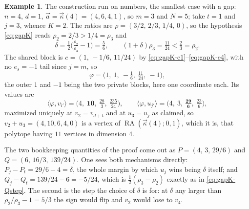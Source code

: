 \documentclass[11pt, a4paper, abstract=yes]{scrartcl}
\theoremstyle{definition}
\newtheorem{mexample}[definition]{Example}
\theoremstyle{remark}
\theoremstyle{plain}
\newcommand{\RA}{\operatorname{RA}}
\newcommand{\kozvec}{\vec\kappa}
\begin{document}
\begin{mexample}
The construction run on numbers, the smallest case with a gap: \(n=4\), \(d=1\),
\(\vec a=\kozvec(4)=(4,6,4,1)\), so \(m=3\) and \(N=5\); take \(t=1\) and \(j=3\), whence \(K=2\).
The ratios are \(\rho=(3/2,\,2/3,\,1/4,\,0)\), so the hypothesis \eqref{eq:gapK} reads
\(\rho_2=2/3>1/4=\rho_3\) and
\begin{equation}\label{eq:gapK-ex}
  \delta=\tfrac12\bigl(\tfrac{\rho_2}{\rho_3}-1\bigr)=\tfrac56,
  \qquad (1+\delta)\rho_3=\tfrac{11}{24}<\tfrac23=\rho_2 .
\end{equation}
The shared block is \(e=(1,\,-1/6,\,11/24)\) by
\eqref{eq:gapK-e1}--\eqref{eq:gapK-e4}, with no \(e_s=-1\) tail since \(j=m\), so
\begin{equation}\label{eq:gapK-ex-2}
  \varphi=\bigl(1,\ 1,\ -\tfrac16,\ \tfrac{11}{24},\ -1\bigr),
\end{equation}
the outer \(1\) and \(-1\) being the two private blocks, here one coordinate each. Its values are
\begin{equation}\label{eq:gapK-ex-3}
  \langle\varphi,v_{i'}\rangle=\bigl(4,\ \mathbf{10},\ \tfrac{28}{3},\ \tfrac{235}{24}\bigr),
  \qquad
  \langle\varphi,u_{j'}\rangle=\bigl(4,\ 3,\ \mathbf{\tfrac{29}{6}},\ \tfrac{23}{6}\bigr),
\end{equation}
maximized uniquely at \(v_2=v_{d+t}\) and at \(u_3=u_j\) as claimed, so
\(v_2+u_3=(4,10,6,4,0)\) is a vertex of \(\RA(\kozvec(4);0,1)\), which it is, that polytope having
\(11\) vertices in dimension \(4\).

The two bookkeeping quantities of the proof come out as \(P=(4,\,3,\,29/6)\) and
\(Q=(6,\,16/3,\,139/24)\). One sees both mechanisms directly: \(P_j-P_t=29/6-4=\delta\), the whole
margin by which \(u_j\) wins being \(\delta\) itself; and \(Q_j-Q_t=139/24-6=-5/24\), which is
\(\tfrac12(\rho_3-\rho_2)\) exactly as in \eqref{eq:gapK-Qstep}. The second is the step the choice of
\(\delta\) is for: at \(\delta\) any larger than \(\rho_2/\rho_3-1=5/3\) the sign would flip and
\(v_2\) would lose to \(v_4\).
\label{ex-gapK}
\end{mexample}
\end{document}

